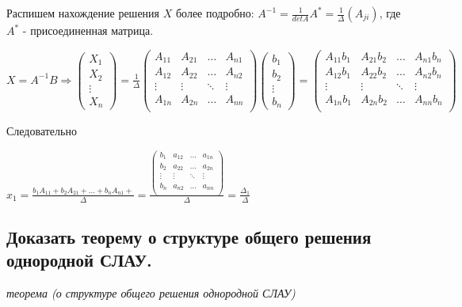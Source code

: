 Распишем нахождение решения $X$ более подробно:
$A^{-1} = \frac{1}{detA}A^* = \frac{1}{\Delta}(A_{ji})$, где $A^*$ - присоединенная матрица.

$X = A^{-1}B \Rightarrow \begin{pmatrix}X_1\\X_2\\\vdots\\X_n\end{pmatrix} = \frac{1}{\Delta}
\begin{pmatrix}
    A_{11}&A_{21}&\ldots&A_{n1}\\
    A_{12}&A_{22}&\ldots&A_{n2}\\
    \vdots&\vdots&\ddots&\vdots\\
    A_{1n}&A_{2n}&\ldots&A_{nn}\\
\end{pmatrix}
\begin{pmatrix}b_1\\b_2\\\vdots\\b_n\end{pmatrix}
=
\begin{pmatrix}
    A_{11}b_1&A_{21}b_2&\ldots&A_{n1}b_n\\
    A_{12}b_1&A_{22}b_2&\ldots&A_{n2}b_n\\
    \vdots&\vdots&\ddots&\vdots\\
    A_{1n}b_1&A_{2n}b_2&\ldots&A_{nn}b_n\\
\end{pmatrix}
$

Следовательно

$
x_1 = \frac{b_1A_{11}+b_2A_{21}+...+b_nA_{n1}+}{\Delta}
=\frac{
\begin{pmatrix}
b_1&a_{12}&\ldots&a_{1n}\\
b_2&a_{22}&\ldots&a_{2n}\\
\vdots&\vdots&\ddots&\vdots\\
b_n&a_{n2}&\ldots&a_{nn}\\\end{pmatrix}}{\Delta}=
\frac{\Delta_1}{\Delta}
$

\ep 

\subsection{Доказать теорему о структуре общего решения однородной СЛАУ.}

\textit {теорема (о структуре общего решения однородной СЛАУ)}

